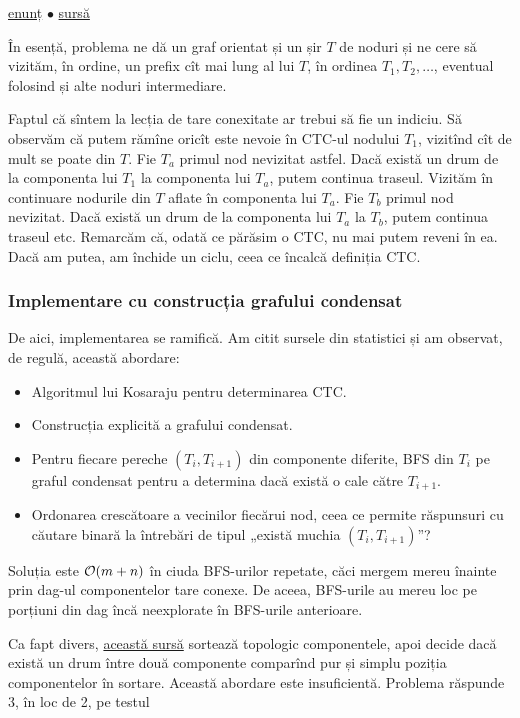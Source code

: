 \documentclass[../main.tex]{subfiles}
\begin{document}
\href{https://kilonova.ro/problems/2288}{enunț}
$\bullet$
\hyperref[code:dog-trick-competition-2]{sursă}

În esență, problema ne dă un graf orientat și un șir $T$ de noduri și ne cere să vizităm, în ordine, un prefix cît mai lung al lui $T$, în ordinea $T_1, T_2, \dots$, eventual folosind și alte noduri intermediare.

Faptul că sîntem la lecția de tare conexitate ar trebui să fie un indiciu.  Să observăm că putem rămîne oricît este nevoie în CTC-ul nodului $T_1$, vizitînd cît de mult se poate din $T$. Fie $T_a$ primul nod nevizitat astfel. Dacă există un drum de la componenta lui $T_1$ la componenta lui $T_a$, putem continua traseul. Vizităm în continuare nodurile din $T$ aflate în componenta lui $T_a$. Fie $T_b$ primul nod nevizitat. Dacă există un drum de la componenta lui $T_a$ la $T_b$, putem continua traseul etc. Remarcăm că, odată ce părăsim o CTC, nu mai putem reveni în ea. Dacă am putea, am închide un ciclu, ceea ce încalcă definiția CTC.

\subsubsection*{Implementare cu construcția grafului condensat}

De aici, implementarea se ramifică. Am citit sursele din statistici și am observat, de regulă, această abordare:

\begin{itemize}
  \item Algoritmul lui Kosaraju pentru determinarea CTC.
  \item Construcția explicită a grafului condensat.
  \item Pentru fiecare pereche $(T_i, T_{i+1})$ din componente diferite, BFS din $T_i$ pe graful condensat pentru a determina dacă există o cale către $T_{i+1}$.
  \item Ordonarea crescătoare a vecinilor fiecărui nod, ceea ce permite răspunsuri cu căutare binară la întrebări de tipul „există muchia $(T_i, T_{i+1})$”?
\end{itemize}

Soluția este $\mathcal{O}(m + n)$ în ciuda BFS-urilor repetate, căci mergem mereu înainte prin dag-ul componentelor tare conexe. De aceea, BFS-urile au mereu loc pe porțiuni din dag încă neexplorate în BFS-urile anterioare.

Ca fapt divers, \href{https://kilonova.ro/submissions/442732}{această sursă} sortează topologic componentele, apoi decide dacă există un drum între două componente comparînd pur și simplu poziția componentelor în sortare. Această abordare este insuficientă. Problema răspunde 3, în loc de 2, pe testul
\end{document}

